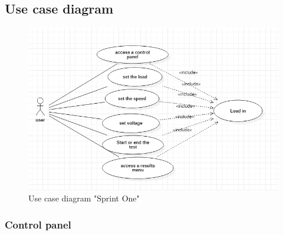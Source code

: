 \documentclass[]{report}
\begin{document}
\subsection{Use case diagram}
\begin{figure}[H]
	\includegraphics[scale=0.9, frame]{sprintOneUseCase.png}
	\caption{Use case diagram "Sprint One"}
\end{figure}

\subsubsection{Control panel}
\end{document}

